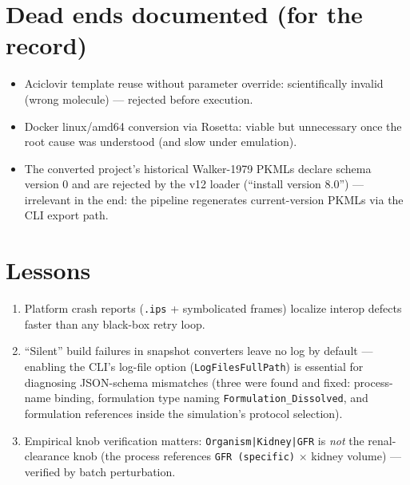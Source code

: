 \section{Dead ends documented (for the record)}
\begin{itemize}
\item Aciclovir template reuse without parameter override: scientifically invalid (wrong molecule) --- rejected before execution.
\item Docker linux/amd64 conversion via Rosetta: viable but unnecessary once the root cause was understood (and slow under emulation).
\item The converted project's historical Walker-1979 PKMLs declare schema version 0 and are rejected by the v12 loader (``install version 8.0'') --- irrelevant in the end: the pipeline regenerates current-version PKMLs via the CLI export path.
\end{itemize}

\section{Lessons}
\begin{enumerate}
\item Platform crash reports (\texttt{.ips} + symbolicated frames) localize interop defects faster than any black-box retry loop.
\item ``Silent'' build failures in snapshot converters leave no log by default --- enabling the CLI's log-file option (\texttt{LogFilesFullPath}) is essential for diagnosing JSON-schema mismatches (three were found and fixed: process-name binding, formulation type naming \texttt{Formulation\_Dissolved}, and formulation references inside the simulation's protocol selection).
\item Empirical knob verification matters: \texttt{Organism|Kidney|GFR} is \emph{not} the renal-clearance knob (the process references \texttt{GFR (specific)} $\times$ kidney volume) --- verified by batch perturbation.
\end{enumerate}
